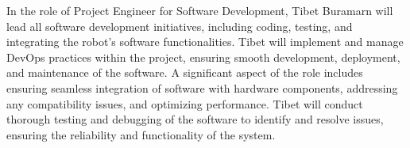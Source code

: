 \begin{enumerate}
    In the role of Project Engineer for Software Development, Tibet Buramarn will lead all software development initiatives, including coding, testing, and integrating the robot’s software functionalities. Tibet will implement and manage DevOps practices within the project, ensuring smooth development, deployment, and maintenance of the software. A significant aspect of the role includes ensuring seamless integration of software with hardware components, addressing any compatibility issues, and optimizing performance. Tibet will conduct thorough testing and debugging of the software to identify and resolve issues, ensuring the reliability and functionality of the system.
\end{enumerate}
    